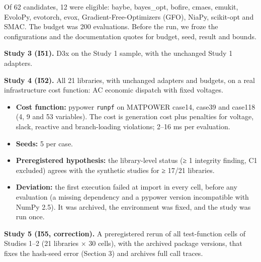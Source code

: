 \documentclass[acmsmall,screen,review,anonymous=false]{acmart}
\providecommand{\tightlist}{\setlength{\itemsep}{0pt}\setlength{\parskip}{0pt}}
\begin{document}
Of 62 candidates, 12 were eligible: baybe, bayes\_opt, bofire, cmaes, emukit, EvoloPy, evotorch, evox,
Gradient-Free-Optimizers (GFO), NiaPy, scikit-opt and SMAC. The budget was 200 evaluations. Before the run, we froze
the configurations and the documentation quotes for budget, seed, result and bounds.

\textbf{Study 3 (I51).} D3x on the Study 1 sample, with the unchanged Study 1 adapters.

\textbf{Study 4 (I52).} All 21 libraries, with unchanged adapters and budgets, on a real infrastructure cost function: AC
economic dispatch with fixed voltages.

\begin{itemize}
\tightlist
\item
  \textbf{Cost function:} pypower \texttt{runpf} on MATPOWER case14, case39 and case118 (4, 9 and 53 variables). The cost is
  generation cost plus penalties for voltage, slack, reactive and branch-loading violations; 2--16 ms per evaluation.
\item
  \textbf{Seeds:} 5 per case.
\item
  \textbf{Preregistered hypothesis:} the library-level status (≥ 1 integrity finding, C1 excluded) agrees with the
  synthetic studies for ≥ 17/21 libraries.
\item
  \textbf{Deviation:} the first execution failed at import in every cell, before any evaluation (a missing dependency and
  a pypower version incompatible with NumPy 2.5). It was archived, the environment was fixed, and the study was run
  once.
\end{itemize}

\textbf{Study 5 (I55, correction).} A preregistered rerun of all test-function cells of Studies 1--2 (21 libraries ×
30 cells), with the archived package versions, that fixes the hash-seed error (Section 3) and archives full call
traces.
\end{document}
